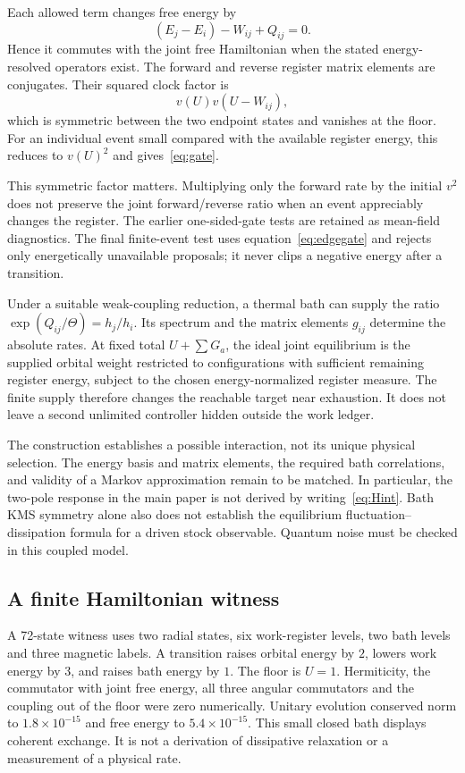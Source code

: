 \documentclass[11pt]{article}
\begin{document}
Each allowed term changes free energy by
\begin{equation}
 (E_j-E_i)-W_{ij}+Q_{ij}=0.
\end{equation}
Hence it commutes with the joint free Hamiltonian when the stated
energy-resolved operators exist. The forward and reverse register matrix
elements are conjugates. Their squared clock factor is
\begin{equation}\label{eq:edgegate}
 v(U)v(U-W_{ij}),
\end{equation}
which is symmetric between the two endpoint states and vanishes at the
floor. For an individual event small compared with the available register
energy, this reduces to $v(U)^2$ and gives~\eqref{eq:gate}.

This symmetric factor matters. Multiplying only the forward rate by the
initial $v^2$ does not preserve the joint forward/reverse ratio when an
event appreciably changes the register. The earlier one-sided-gate tests
are retained as mean-field diagnostics. The final finite-event test uses
equation~\eqref{eq:edgegate} and rejects only energetically unavailable
proposals; it never clips a negative energy after a transition.

Under a suitable weak-coupling reduction, a thermal bath can supply the
ratio $\exp(Q_{ij}/\Theta)=h_j/h_i$. Its spectrum and the matrix elements
$g_{ij}$ determine the absolute rates. At fixed total $U+\sum G_a$, the
ideal joint equilibrium is the supplied orbital weight restricted to
configurations with sufficient remaining register energy, subject to the
chosen energy-normalized register measure. The finite supply therefore
changes the reachable target near exhaustion. It does not leave a second
unlimited controller hidden outside the work ledger.

The construction establishes a possible interaction, not its unique
physical selection. The energy basis and matrix elements, the required
bath correlations, and validity of a Markov approximation remain to be
matched. In particular, the two-pole response in the main paper is not
derived by writing~\eqref{eq:Hint}. Bath KMS symmetry alone also does not
establish the equilibrium fluctuation--dissipation formula for a driven
stock observable. Quantum noise must be checked in this coupled model.

\subsection{A finite Hamiltonian witness}
A 72-state witness uses two radial states, six work-register levels, two
bath levels and three magnetic labels. A transition raises orbital energy
by $2$, lowers work energy by $3$, and raises bath energy by $1$. The
floor is $U=1$. Hermiticity, the commutator with joint free energy, all
three angular commutators and the coupling out of the floor were zero
numerically. Unitary evolution conserved norm to $1.8\times10^{-15}$ and
free energy to $5.4\times10^{-15}$.
This small closed bath displays coherent exchange. It is not a derivation
of dissipative relaxation or a measurement of a physical rate.
\end{document}
